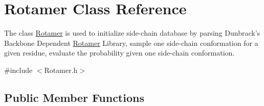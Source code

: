 \hypertarget{classRotamer}{\section{Rotamer Class Reference}
\label{classRotamer}
}


The class \hyperlink{classRotamer}{Rotamer} is used to initialize side-\/chain database by parsing Dunbrack's Backbone Dependent \hyperlink{classRotamer}{Rotamer} Library, sample one side-\/chain conformation for a given residue, evaluate the probability given one side-\/chain conformation.  




{\ttfamily \#include $<$Rotamer.\-h$>$}

\subsection*{Public Member Functions}
